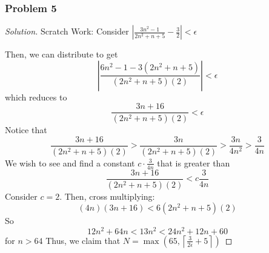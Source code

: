 \documentclass[11pt]{article}
\newcommand{\1}{\mathbf{1}}
\theoremstyle{definition}
\newenvironment{solution}{\begin{proof}[Solution]}{\end{proof}}
\begin{document}
\subsubsection*{Problem 5}
\begin{solution}
    Scratch Work: Consider $\left|\frac{3n^2-1}{2n^2+n+5}-\frac{3}{2}\right| < \epsilon$
    \par Then, we can distribute to get $$\left|\frac{6n^2 - 1 - 3(2n^2 + n + 5)}{(2n^2+n+5)(2)}\right| < \epsilon$$
    which reduces to $$\frac{3n+16}{(2n^2+n+5)(2)} < \epsilon$$
    Notice that $$\frac{3n+16}{(2n^2+n+5)(2)} > \frac{3n}{(2n^2+n+5)(2)} >
    \frac{3n}{4n^2} > \frac{3}{4n}$$
    We wish to see and find a constant $c \cdot \frac{3}{4n}$ that is greater than
   $$\frac{3n+16}{(2n^2+n+5)(2)} < c\frac{3}{4n}$$
   Consider $c = 2.$
   Then, cross multiplying: $$(4n)(3n+16) < 6(2n^2+n+5)(2)$$
   So $$12n^2 + 64n < 13n^2 < 24n^2 + 12n + 60$$ 
   for $n > 64$
   Thus, we claim that $N = \max\left(65, \left\lceil \frac{3}{2\epsilon} + 5 \right\rceil\right)$
\end{solution}
\end{document}
